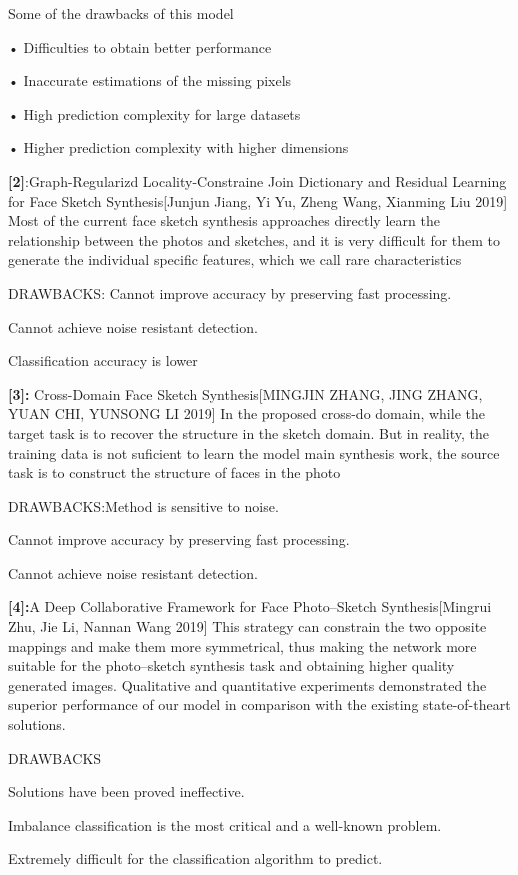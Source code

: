 \documentclass[journal]{IEEEtran} %
\begin{document}
{Some of the drawbacks of this model } 

•	Difficulties to obtain better performance 

•	Inaccurate estimations of the missing pixels

•	High prediction complexity for large datasets 

•	Higher prediction complexity with higher dimensions 

\textbf{[2]}:Graph-Regularizd Locality-Constraine Join  Dictionary and Residual Learning for Face Sketch Synthesis[Junjun Jiang, Yi Yu, Zheng Wang, Xianming Liu 2019]
Most of the current face sketch synthesis approaches directly learn the relationship between the photos and sketches, and it is very difficult for them to generate the individual specific features, which we call rare characteristics

{DRAWBACKS:}
Cannot improve accuracy by preserving fast processing.

Cannot achieve noise resistant detection.

Classification accuracy is lower

\textbf{[3]: }Cross-Domain Face Sketch Synthesis[MINGJIN ZHANG, JING ZHANG, YUAN CHI, YUNSONG LI 2019]
In the proposed cross-do domain, while the target task is to recover the structure in the sketch domain. But in reality, the training data is not suficient to learn the model main synthesis work, the source task is to construct the structure of faces in the photo

{DRAWBACKS:}Method is sensitive to noise.

Cannot improve accuracy by preserving fast processing.

Cannot achieve noise resistant detection.

\textbf{[4]:}A Deep Collaborative Framework for Face Photo–Sketch Synthesis[Mingrui Zhu, Jie Li, Nannan Wang 2019]
This strategy can constrain the two opposite mappings and make them more symmetrical, thus making the network more suitable for the photo–sketch synthesis task and obtaining higher quality generated images. Qualitative and quantitative experiments demonstrated the superior performance of our model in comparison with the existing state-of-theart solutions.

{DRAWBACKS}

Solutions have been proved ineffective.

Imbalance classification is the most critical and a well-known problem.

Extremely difficult for the classification algorithm to predict.
\end{document}
